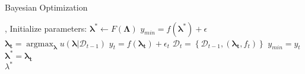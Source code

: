  
\begin{algorithm}
	\caption{Bayesian Optimization}
	\label{alg:bo}
	
	\begin{algorithmic}
		\State {}, 
		\State Initialize parameters: $\mathbf{\lambda^*} \gets F(\mathbf{\Lambda})$
		\State $y_{min} = f(\mathbf{\lambda^*}) + \epsilon$
		\State $\mathbf{\lambda_t} = \operatorname*{argmax}_{\mathbf{\lambda}} u(\mathbf{\lambda}|\mathcal{D}_{t-1})$ 
		\State $y_t = f(\mathbf{\lambda_t}) + \epsilon_t$
		\State $\mathcal{D}_t = \left\lbrace \mathcal{D}_{t-1}, (\mathbf{\lambda_t}, f_t) \right\rbrace $
		\State {}
		\State $y_{min} = y_t$
		\State $\mathbf{\lambda^*} = \mathbf{\lambda_t}$
		\EndIf
		\EndFor
		\\
		\Return $\lambda^*$
	\end{algorithmic}
\end{algorithm}

